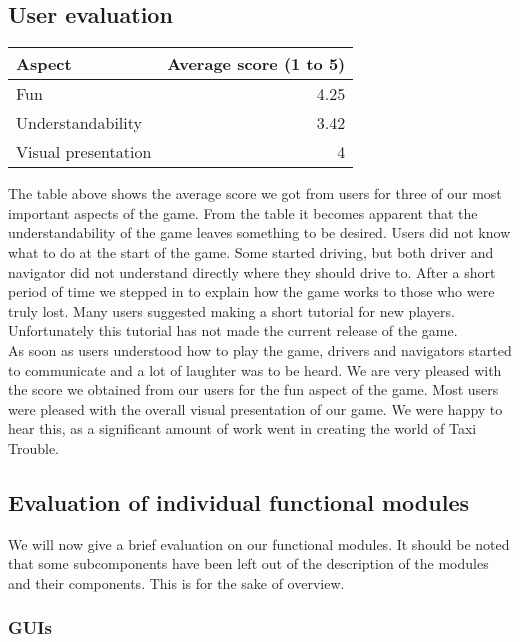\subsection{User evaluation}{
\begin{center}
\begin{tabular}{| l | r |}
	\hline
	Aspect & Average score (1 to 5) \\ \hline
	Fun & 4.25 \\ \hline
	Understandability  & 3.42 \\ \hline
	Visual presentation & 4\\ \hline
\end{tabular}
\end{center} 

The table above shows the average score we got from users for three of our most important aspects of the game. From the table it becomes apparent that the understandability  of the game leaves something to be desired. Users did not know what to do at the start of the game. Some started driving, but both driver and navigator did not understand directly where they should drive to. After a short period of time we stepped in to explain how the game works to those who were truly lost. Many users suggested making a short tutorial for new players. Unfortunately this tutorial has not made the current release of the game.\\

As soon as users understood how to play the game, drivers and navigators started to communicate and a lot of laughter was to be heard. We are very pleased with the score we obtained from our users for the fun aspect of the game. Most users were pleased with the overall visual presentation of our game. We were happy to hear this, as a significant amount of work went in creating the world of Taxi Trouble.

\subsection{Evaluation of individual functional modules}

We will now give a brief evaluation on our functional modules. It should be noted that some subcomponents have been left out of the description of the modules and their components. This is for the sake of overview.

\subsubsection{GUIs}

}
